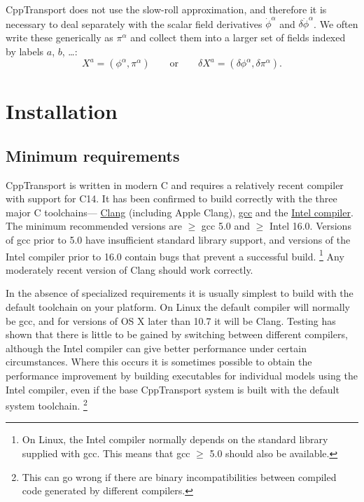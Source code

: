 \documentclass[11pt,a4paper]{article}
\newcommand{\packagefont}{\sffamily}
\newcommand{\CppTransport}{{\packagefont CppTransport}}
\newcommand{\semibold}[1]{{\fontseries{b}\selectfont{#1}}}
\newcommand{\para}[1]{\par\vspace{2mm}\noindent\semibold{{#1.}---}\ignorespaces}
\newcommand\CC{C\nolinebreak\hspace{-.05em}\raisebox{.4ex}{\relsize{-3}{\textbf{+}}}\nolinebreak\hspace{-.10em}\raisebox{.4ex}{\relsize{-3}{\textbf{+}}}}
\renewcommand{\geq}{\geqslant}
\begin{document}
{\CppTransport} does not use the slow-roll approximation, and therefore it is necessary
to deal separately with the scalar field derivatives
$\dot{\phi}^\alpha$ and $\delta\dot{\phi}^\alpha$.
We often write these generically as $\pi^\alpha$ and collect them
into a larger
set of fields indexed by labels $a$, $b$, \ldots:
\begin{equation}
    X^a = (\phi^\alpha, \pi^\alpha)
    \qquad
    \text{or}
    \qquad
    \delta X^a = (\delta\phi^\alpha, \delta\pi^\alpha) .    
\end{equation}

\section{Installation}

\subsection{Minimum requirements}

\para{Compiler}
{\CppTransport} is written in modern {\CC} and requires a relatively recent compiler
with support for {\CC}14.
It has been confirmed to build
correctly with the three major {\CC} toolchains---%
\href{http://clang.llvm.org}{Clang}
(including Apple Clang),
\href{https://gcc.gnu.org}{gcc} and the
\href{https://software.intel.com/en-us/c-compilers}{Intel compiler}.
The minimum recommended versions
are $\geq$ gcc 5.0
and $\geq$ Intel 16.0.
Versions of gcc prior to 5.0 have insufficient standard library support,
and versions of the Intel compiler prior to 16.0
contain bugs that prevent a successful build.%
    \footnote{On Linux, the Intel compiler normally depends on the
    standard library supplied with gcc.
    This means that gcc $\geq$ 5.0 should also be available.}
Any moderately recent version of Clang should work correctly.

In the absence of specialized requirements
it is usually simplest to build with the default
toolchain on your platform.
On Linux the default compiler
will normally be gcc, and for versions of OS X later than 10.7
it will be Clang.
Testing has shown that there is little to be gained by switching between
different compilers, although the Intel compiler can give better performance
under certain circumstances.
Where this occurs
it is sometimes possible to obtain the performance improvement
by building executables for individual models using the Intel compiler,
even if the base {\CppTransport} system is built with the default system
toolchain.%
    \footnote{This can go wrong if there are binary incompatibilities
    between compiled code generated by different compilers.}
\end{document}
